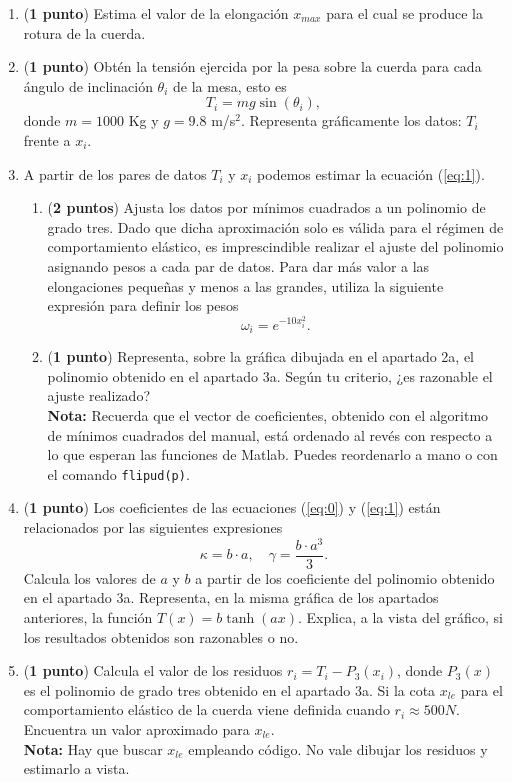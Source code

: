 \begin{enumerate}
\item (\textbf{1 punto}) Estima el valor de la elongación $x_{max}$ para el cual se produce la rotura de la cuerda.

\item (\textbf{1 punto}) Obtén la tensión ejercida por la pesa sobre la cuerda para cada ángulo de inclinación $\theta_i$ de la mesa, esto es
\begin{equation} \label{eq:2}
T_i = mg\sin(\theta_i),
\end{equation}
donde $m =1000$ Kg y $g = 9.8$ m/s$^2$. Representa gráficamente los datos: $T_i$ frente a $x_i$.

\item A partir de los pares de datos $T_i$ y $x_i$ podemos estimar la ecuación (\ref{eq:1}).
\begin{enumerate}
\item (\textbf{2 puntos}) Ajusta los datos por mínimos cuadrados a un polinomio de grado tres. Dado que dicha aproximación solo es válida para el régimen de comportamiento elástico, es imprescindible realizar el ajuste del polinomio asignando pesos a cada par de datos. Para dar más valor a las elongaciones pequeñas y menos a las grandes, utiliza la siguiente expresión para definir los pesos
\begin{equation}
\omega_i = e^{-10x_i^2}.
\end{equation}
\item (\textbf{1 punto})  Representa, sobre la gráfica dibujada en el apartado 2a, el polinomio obtenido en el apartado 3a. Según tu criterio, ¿es razonable el ajuste realizado? \\ \textbf{Nota:} Recuerda que el vector de coeficientes, obtenido con el algoritmo de mínimos cuadrados del manual, está ordenado al revés con respecto a lo que esperan las funciones de Matlab. Puedes reordenarlo a mano o con el comando \texttt{flipud(p)}.
\end{enumerate}

\item (\textbf{1 punto})  Los coeficientes de las ecuaciones (\ref{eq:0}) y (\ref{eq:1}) están relacionados por las siguientes expresiones
\begin{equation}
\kappa = b\cdot a, \quad \gamma = \frac{b\cdot a^3}{3}. \nonumber
\end{equation}
		Calcula los valores de $a$ y $b$ a partir de los coeficiente del polinomio obtenido en el apartado 3a. Representa, en la misma gráfica de los apartados anteriores, la función $T(x) = b\tanh(ax)$. Explica, a la vista del gráfico, si los resultados obtenidos son razonables o no. 

\item (\textbf{1 punto}) Calcula el valor de los residuos $r_i = T_i - P_3(x_i)$, donde $P_3(x)$ es el polinomio de grado tres obtenido en el apartado 3a. Si la cota $x_{le}$ para el comportamiento elástico de la cuerda viene definida cuando $r_i \approx 500 N$. Encuentra un valor aproximado para $x_{le}$. \\
\textbf{Nota:} Hay que buscar $x_{le}$ empleando código. No vale dibujar los residuos y estimarlo a vista.
\end{enumerate}

